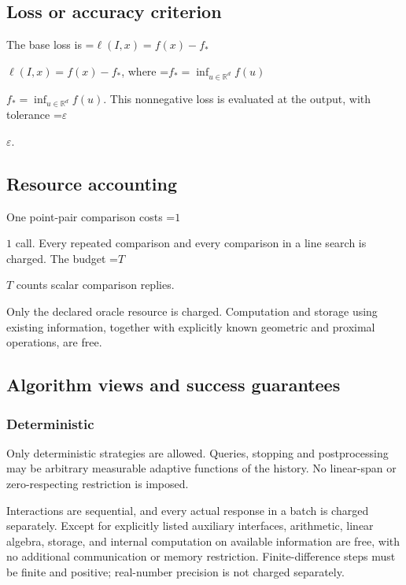 \documentclass[10pt,a4paper]{article}
\newcommand{\AtlasMath}[1]{\par\begingroup\centering\setbox0=\hbox{$\displaystyle #1$}\ifdim\wd0>1.4\linewidth\typeout{ATLAS WIDE FORMULA: \the\wd0}\fi\ifdim\wd0>\linewidth\resizebox{\linewidth}{!}{\box0}\else\box0\fi\par\endgroup}
\newcommand{\AtlasInlineMath}[1]{\begingroup\setbox0=\hbox{$#1$}\ifdim\wd0>.4\linewidth\endgroup\AtlasMath{#1}\else\endgroup$#1$\fi}
\begin{document}
\subsection{Loss or accuracy criterion}


The base loss is \AtlasInlineMath{\ell(I,x)=f(x)-f_*}, where \AtlasInlineMath{f_*=\inf_{u\in \mathbb{R}^d}f(u)}. This nonnegative loss is evaluated at the output, with tolerance \AtlasInlineMath{\varepsilon}.



\subsection{Resource accounting}


One point-pair comparison costs \AtlasInlineMath{1} call. Every repeated comparison and every comparison in a line search is charged. The budget \AtlasInlineMath{T} counts scalar comparison replies.



Only the declared oracle resource is charged. Computation and storage using existing information, together with explicitly known geometric and proximal operations, are free.



\subsection{Algorithm views and success guarantees}


\subsubsection{Deterministic}


Only deterministic strategies are allowed. Queries, stopping and postprocessing may be arbitrary measurable adaptive functions of the history. No linear-span or zero-respecting restriction is imposed.



Interactions are sequential, and every actual response in a batch is charged separately. Except for explicitly listed auxiliary interfaces, arithmetic, linear algebra, storage, and internal computation on available information are free, with no additional communication or memory restriction. Finite-difference steps must be finite and positive; real-number precision is not charged separately.
\end{document}
